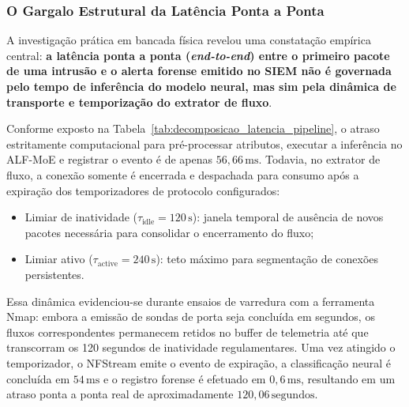 \subsubsection{O Gargalo Estrutural da Latência Ponta a Ponta}

A investigação prática em bancada física revelou uma constatação empírica central: \textbf{a latência
ponta a ponta (\emph{end-to-end}) entre o primeiro pacote de uma intrusão e o alerta forense emitido no
SIEM não é governada pelo tempo de inferência do modelo neural, mas sim pela dinâmica de transporte e
temporização do extrator de fluxo}.

Conforme exposto na Tabela~\ref{tab:decomposicao_latencia_pipeline}, o atraso estritamente computacional
para pré-processar atributos, executar a inferência no ALF-MoE e registrar o evento é de apenas
$56{,}66\,\mathrm{ms}$. Todavia, no extrator de fluxo, a conexão somente é encerrada e despachada para
consumo após a expiração dos temporizadores de protocolo configurados:
\begin{itemize}
    \item Limiar de inatividade ($\tau_{\mathrm{idle}} = 120\,\mathrm{s}$): janela temporal de
    ausência de novos pacotes necessária para consolidar o encerramento do fluxo;
    \item Limiar ativo ($\tau_{\mathrm{active}} = 240\,\mathrm{s}$): teto máximo para segmentação
    de conexões persistentes.
\end{itemize}

Essa dinâmica evidenciou-se durante ensaios de varredura com a ferramenta Nmap: embora a emissão de
sondas de porta seja concluída em segundos, os fluxos correspondentes permanecem retidos no buffer de
telemetria até que transcorram os 120 segundos de inatividade regulamentares. Uma vez atingido o
temporizador, o NFStream emite o evento de expiração, a classificação neural é concluída em
$54\,\mathrm{ms}$ e o registro forense é efetuado em $0{,}6\,\mathrm{ms}$, resultando em um atraso
ponta a ponta real de aproximadamente $120{,}06\,\mathrm{segundos}$.

